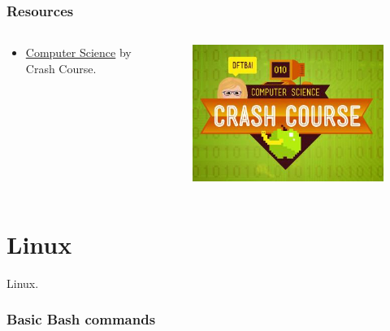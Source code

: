 \documentclass[aspectratio=169]{beamer}
\begin{document}
\begin{frame}
    \frametitle{Resources}
    \begin{columns}
        \begin{column}{0.5\textwidth}
            \begin{itemize}
                \item \href{https://thecrashcourse.com/topic/computerscience/}
                    {Computer Science} by Crash Course.
            \end{itemize}
        \end{column}
        \begin{column}{0.5\textwidth}
            \begin{figure}
                \centering
                \includegraphics[scale=0.4]
                {img/crash_course_computer_science.jpg}
            \end{figure}
        \end{column}
    \end{columns}
\end{frame}



\section{Linux}



\begin{frame}
    Linux.
\end{frame}

\begin{frame}[allowframebreaks]
    \frametitle{Basic Bash commands}
    
\end{frame}
\end{document}
